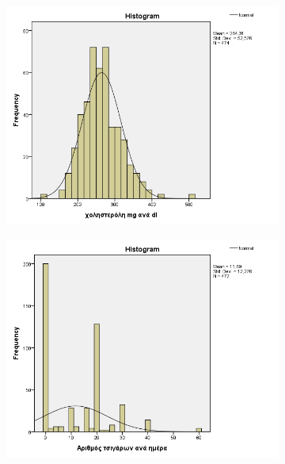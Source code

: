     \clearpage
    \begin{figure}
 \centering
            \begin{subfigure}{0.7\textwidth}
     \centering
         \includegraphics[width=\textwidth]{images/14.png}
                      \end{subfigure}
                      
     \begin{subfigure}{0.7\textwidth}
     \centering
     \vspace{0.5cm}
         \includegraphics[width=\textwidth]{images/15.png}
                      \end{subfigure}
    \end{figure}
    
